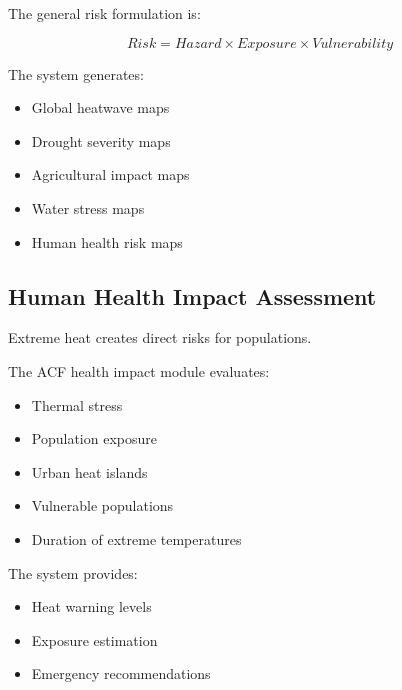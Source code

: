 The general risk formulation is:

\[
Risk =
Hazard
\times
Exposure
\times
Vulnerability
\]


The system generates:

\begin{itemize}

\item Global heatwave maps

\item Drought severity maps

\item Agricultural impact maps

\item Water stress maps

\item Human health risk maps

\end{itemize}



\subsection{Human Health Impact Assessment}

Extreme heat creates direct risks for populations.

The ACF health impact module evaluates:

\begin{itemize}

\item Thermal stress

\item Population exposure

\item Urban heat islands

\item Vulnerable populations

\item Duration of extreme temperatures

\end{itemize}


The system provides:

\begin{itemize}

\item Heat warning levels

\item Exposure estimation

\item Emergency recommendations

\end{itemize}


